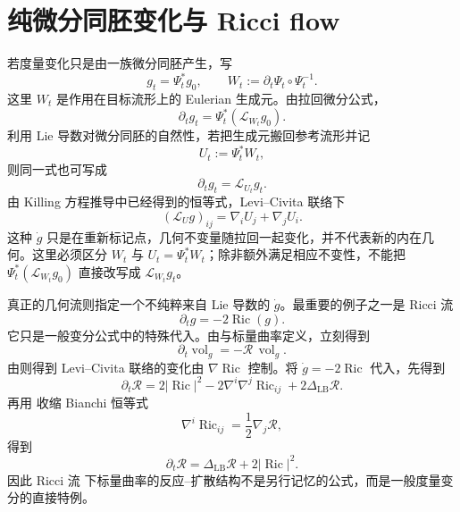 \section{纯微分同胚变化与 Ricci flow}

若度量变化只是由一族微分同胚产生，写
\[
g_t=\Psi_t^*g_0,
\qquad
W_t:=\partial_t\Psi_t\circ\Psi_t^{-1}.
\]
这里 $W_t$ 是作用在目标流形上的 Eulerian 生成元。由拉回微分公式，
\[
\partial_tg_t
=\Psi_t^*(\mathcal L_{W_t}g_0).
\]
利用 Lie 导数对微分同胚的自然性，若把生成元搬回参考流形并记
\[
U_t:=\Psi_t^*W_t,
\]
则同一式也可写成
\begin{equation*}\boxed{\partial_tg_t=\mathcal L_{U_t}g_t.}
\end{equation*}
由 Killing 方程推导中已经得到的恒等式，Levi--Civita 联络下
\begin{equation*}(\mathcal L_Ug)_{ij}
=\nabla_iU_j+\nabla_jU_i.
\end{equation*}
这种 $\dot g$ 只是在重新标记点，几何不变量随拉回一起变化，并不代表新的内在几何。这里必须区分 $W_t$ 与 $U_t=\Psi_t^*W_t$；除非额外满足相应不变性，不能把 $\Psi_t^*(\mathcal L_{W_t}g_0)$ 直接改写成 $\mathcal L_{W_t}g_t$。

真正的几何流则指定一个不纯粹来自 Lie 导数的 $\dot g$。最重要的例子之一是 Ricci 流
\begin{equation*}\partial_tg=-2\operatorname{Ric}(g).
\end{equation*}
它只是一般变分公式中的特殊代入。由与标量曲率定义，立刻得到
\begin{equation}\label{eq:math-dg-ricci-flow-volume}
\partial_t\operatorname{vol}_g
=-\mathcal R\,\operatorname{vol}_g.
\end{equation}
由则得到 Levi--Civita 联络的变化由 $\nabla\operatorname{Ric}$ 控制。将 $\dot g=-2\operatorname{Ric}$ 代入，先得到
\[
\partial_t\mathcal R
=2|\operatorname{Ric}|^2
-2\nabla^i\nabla^j\operatorname{Ric}_{ij}
+2\Delta_{\mathrm{LB}}\mathcal R.
\]
再用 收缩 Bianchi 恒等式
\[
\nabla^i\operatorname{Ric}_{ij}=\frac12\nabla_j\mathcal R,
\]
得到
\begin{equation}\label{eq:math-dg-ricci-flow-scalar-curvature}
\boxed{
\partial_t\mathcal R
=\Delta_{\mathrm{LB}}\mathcal R+2|\operatorname{Ric}|^2.}
\end{equation}
因此 Ricci 流 下标量曲率的反应--扩散结构不是另行记忆的公式，而是一般度量变分的直接特例。

